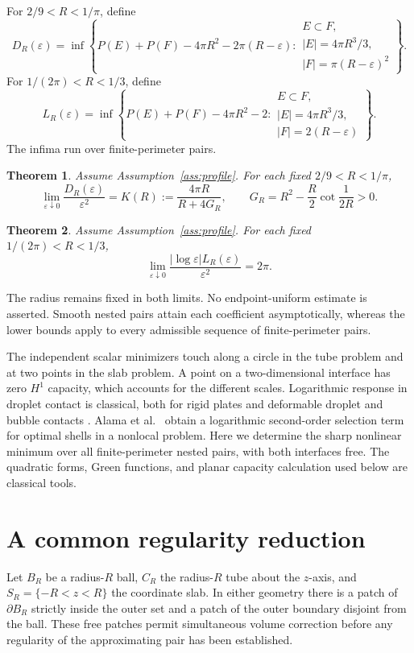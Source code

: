 \documentclass[11pt,reqno]{amsart}
\numberwithin{equation}{section}
\newtheorem{theorem}{Theorem}[section]
\theoremstyle{definition}
\theoremstyle{remark}
\newcommand{\eps}{\varepsilon}
\begin{document}
For $2/9<R<1/\pi$, define
\begin{equation}\label{eq:D}
 D_R(\eps)=\inf\left\{P(E)+P(F)-4\pi R^2-2\pi(R-\eps):
 \begin{array}{l}E\subset F,\\|E|=4\pi R^3/3,\\|F|=\pi(R-\eps)^2\end{array}\right\}.
\end{equation}
For $1/(2\pi)<R<1/3$, define
\begin{equation}\label{eq:L}
 L_R(\eps)=\inf\left\{P(E)+P(F)-4\pi R^2-2:
 \begin{array}{l}E\subset F,\\|E|=4\pi R^3/3,\\|F|=2(R-\eps)\end{array}\right\}.
\end{equation}
The infima run over finite-perimeter pairs.

\begin{theorem}\label{thm:tube}
Assume Assumption~\ref{ass:profile}. For each fixed $2/9<R<1/\pi$,
\[
 \lim_{\eps\downarrow0}\frac{D_R(\eps)}{\eps^2}
 =K(R):=\frac{4\pi R}{R+4G_R},\qquad
 G_R=R^2-\frac R2\cot\frac1{2R}>0.
\]
\end{theorem}
\begin{theorem}\label{thm:slab}
Assume Assumption~\ref{ass:profile}. For each fixed $1/(2\pi)<R<1/3$,
\[
 \lim_{\eps\downarrow0}\frac{|\log\eps|L_R(\eps)}{\eps^2}=2\pi.
\]
\end{theorem}
The radius remains fixed in both limits. No endpoint-uniform estimate
is asserted. Smooth nested pairs attain each coefficient
asymptotically, whereas the lower bounds apply to every admissible
sequence of finite-perimeter pairs.

The independent scalar minimizers touch along a circle in the tube
problem and at two points in the slab problem. A point on a
two-dimensional interface has zero $H^1$ capacity, which accounts for
the different scales. Logarithmic response in droplet contact is
classical, both for rigid plates \cite{LGL,Lv} and deformable droplet
and bubble contacts \cite{MW,Ginot}. Alama et al.\
\cite[Theorem 4.5]{ABLW} obtain a logarithmic second-order selection
term for optimal shells in a nonlocal problem. Here we determine the
sharp nonlinear minimum over all finite-perimeter nested pairs, with
both interfaces free. The quadratic forms, Green functions, and planar capacity
calculation used below are classical tools.

\section{A common regularity reduction}\label{sec:regularity}
Let $B_R$ be a radius-$R$ ball, $C_R$ the radius-$R$ tube about the
$z$-axis, and $S_R=\{-R<z<R\}$ the coordinate slab.
In either geometry there is a patch of $\partial B_R$ strictly inside
the outer set and a patch of the outer boundary disjoint from the ball.
These free patches permit simultaneous volume correction before any
regularity of the approximating pair has been established.
\end{document}
